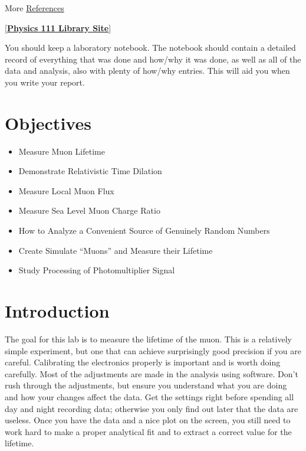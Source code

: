 \documentclass{../lab}
\begin{document}
More \hyperref[sec:References]{References}

[\href{http://physics111.lib.berkeley.edu/Physics111/Reprints/MUO/MUO\_index.html}{\textbf{Physics 111 Library Site}}]

You should keep a laboratory notebook. The notebook should contain a detailed record of everything that was done and how/why it was done, as well as all of the data and analysis, also with plenty of how/why entries. This will aid you when you write your report.

\section{Objectives}

\begin{itemize}
    \item Measure Muon Lifetime

    \item Demonstrate Relativistic Time Dilation

    \item Measure Local Muon Flux

    \item Measure Sea Level Muon Charge Ratio

    \item How to Analyze a Convenient Source of Genuinely Random Numbers

    \item Create Simulate ``Muons'' and Measure their Lifetime

    \item Study Processing of Photomultiplier Signal

\end{itemize}

\section{Introduction}

The goal for this lab is to measure the lifetime of the muon. This is a relatively simple experiment, but one that can achieve surprisingly good precision if you are careful. Calibrating the electronics properly is important and is worth doing carefully. Most of the adjustments are made in the analysis using software. Don't rush through the adjustments, but ensure you understand what you are doing and how your changes affect the data. Get the settings right before spending all day and night recording data; otherwise you only find out later that the data are useless. Once you have the data and a nice plot on the screen, you still need to work hard to make a proper analytical fit and to extract a correct value for the lifetime.
\end{document}
